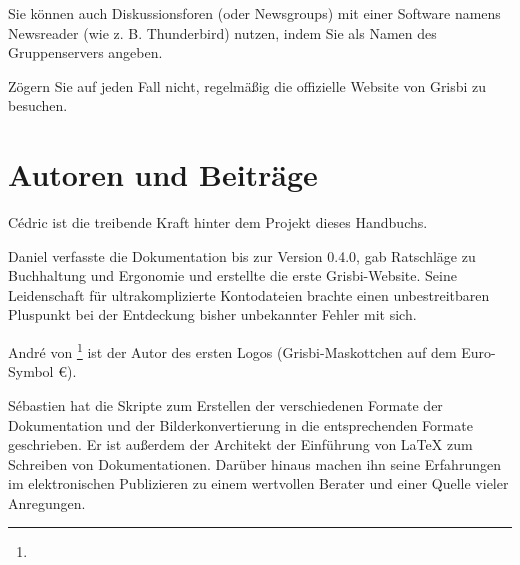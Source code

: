 
Sie können auch Diskussionsforen (oder Newsgroups) mit einer Software namens \glqq{}Newsreader\grqq{} (wie z. B. Thunderbird) nutzen, indem Sie  als Namen des Gruppenservers angeben.

Zögern Sie auf jeden Fall nicht, regelmäßig die offizielle Website von Grisbi zu besuchen.



\section{Autoren und Beiträge\label{introduction-authors}}		%


Cédric  ist die treibende Kraft hinter dem Projekt dieses Handbuchs.

Daniel  verfasste die Dokumentation bis zur Version 0.4.0, gab Ratschläge zu Buchhaltung und Ergonomie und erstellte die erste Grisbi-Website. Seine Leidenschaft für ultrakomplizierte Kontodateien brachte einen unbestreitbaren Pluspunkt bei der Entdeckung bisher unbekannter Fehler mit sich.

André  von \footnote{\urlLinuxGraphic{}} ist der Autor des ersten Logos (Grisbi-Maskottchen auf dem Euro-Symbol €).

Sébastien  hat die Skripte zum Erstellen der verschiedenen Formate der Dokumentation und der Bilderkonvertierung in die entsprechenden Formate geschrieben. Er ist außerdem der Architekt der Einführung von \gls{LaTeX} zum Schreiben von Dokumentationen. Darüber hinaus machen ihn seine Erfahrungen im elektronischen Publizieren zu einem wertvollen Berater und einer Quelle vieler Anregungen.

